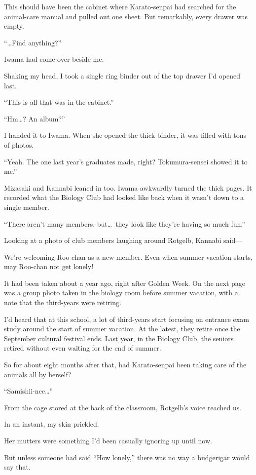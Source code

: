 \documentclass[
    a4paper,
    12pt,
    twoside,
    openany,
    UTF8,
    fontset=windows
]{ctexbook}
\begin{document}
This should have been the cabinet where Karato-senpai had searched for the animal-care manual and pulled out one sheet. But remarkably, every drawer was empty.

``\dots Find anything?''

Iwama had come over beside me.

Shaking my head, I took a single ring binder out of the top drawer I'd opened last.

``This is all that was in the cabinet.''

``Hm\dots? An album?''

I handed it to Iwama. When she opened the thick binder, it was filled with tons of photos.

``Yeah. The one last year's graduates made, right? Tokumura-sensei showed it to me.''

Mizasaki and Kannabi leaned in too. Iwama awkwardly turned the thick pages. It recorded what the Biology Club had looked like back when it wasn't down to a single member.

``There aren't many members, but\dots\ they look like they're having so much fun.''

Looking at a photo of club members laughing around Rotgelb, Kannabi said---

We're welcoming Roo-chan as a new member. Even when summer vacation starts, may Roo-chan not get lonely!

It had been taken about a year ago, right after Golden Week. On the next page was a group photo taken in the biology room before summer vacation, with a note that the third-years were retiring.

I'd heard that at this school, a lot of third-years start focusing on entrance exam study around the start of summer vacation. At the latest, they retire once the September cultural festival ends. Last year, in the Biology Club, the seniors retired without even waiting for the end of summer.

So for about eight months after that, had Karato-senpai been taking care of the animals all by herself?

``Samishii-nee\dots''

From the cage stored at the back of the classroom, Rotgelb's voice reached us.

In an instant, my skin prickled.

Her mutters were something I'd been casually ignoring up until now.

But unless someone had said ``How lonely,'' there was no way a budgerigar would say that.
\end{document}
